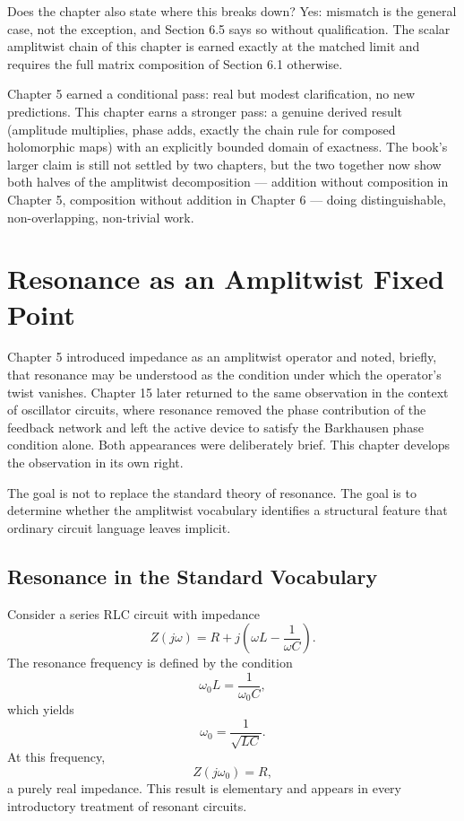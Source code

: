 \documentclass[12pt]{article}
\begin{document}
Does the chapter also state where this breaks down? Yes: mismatch is the general case, not the exception, and Section 6.5 says so without qualification. The scalar amplitwist chain of this chapter is earned exactly at the matched limit and requires the full matrix composition of Section 6.1 otherwise.

Chapter 5 earned a conditional pass: real but modest clarification, no new predictions. This chapter earns a stronger pass: a genuine derived result (amplitude multiplies, phase adds, exactly the chain rule for composed holomorphic maps) with an explicitly bounded domain of exactness. The book's larger claim is still not settled by two chapters, but the two together now show both halves of the amplitwist decomposition — addition without composition in Chapter 5, composition without addition in Chapter 6 — doing distinguishable, non-overlapping, non-trivial work.

\section{Resonance as an Amplitwist Fixed Point}

Chapter 5 introduced impedance as an amplitwist operator and noted, briefly, that resonance may be understood as the condition under which the operator's twist vanishes. Chapter 15 later returned to the same observation in the context of oscillator circuits, where resonance removed the phase contribution of the feedback network and left the active device to satisfy the Barkhausen phase condition alone. Both appearances were deliberately brief. This chapter develops the observation in its own right.

The goal is not to replace the standard theory of resonance. The goal is to determine whether the amplitwist vocabulary identifies a structural feature that ordinary circuit language leaves implicit.

\subsection{Resonance in the Standard Vocabulary}

Consider a series RLC circuit with impedance
\[
Z(j\omega)=R+j\left(\omega L-\frac{1}{\omega C}\right).
\]
The resonance frequency is defined by the condition
\[
\omega_0L=\frac{1}{\omega_0C},
\]
which yields
\[
\omega_0=\frac{1}{\sqrt{LC}}.
\]
At this frequency,
\[
Z(j\omega_0)=R,
\]
a purely real impedance. This result is elementary and appears in every introductory treatment of resonant circuits.
\end{document}
